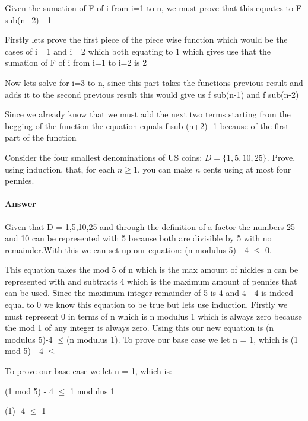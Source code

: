 \documentclass{article}
\begin{document}
{{Given the sumation of F of i from i=1 to n, we must prove that this equates to F sub(n+2) - 1 }

{Firstly lets prove the first piece of the piece wise function which would be the cases of i =1 and i =2 which both equating to 1 which gives use that the sumation of F of i from i=1 to i=2 is 2}

{Now lets solve for i=3 to n, since this part takes the functions previous result and adds it to the second previous result this would give us f sub(n-1) and f sub(n-2)}

{Since we already know that we must add the next two terms starting from the begging of the function the equation equals f sub (n+2) -1 because of the first part of the function}

 

Consider the four smallest denominations of US coins: $D=\{1,5,10,25\}$.  Prove, using
induction, that, for each $n \geq 1$, you can make $n$ cents using at most four
pennies.

\paragraph{Answer}


{Given that D = 1,5,10,25 and through the definition of a factor the numbers 25 and 10 can be represented with 5 because both are divisible by 5 with no remainder.With this we can set up our equation: (n modulus 5) - 4 $ \le $ 0. }

{This equation takes the mod 5 of n which is the max amount of nickles n can be represented with and subtracts 4 which is the maximum amount of pennies that can be used. Since the maximum integer remainder of 5 is 4 and 4 - 4 is indeed equal to 0 we know this equation to be true but lets use induction. Firstly we must represent 0 in terms of n which is n modulus 1 which is always zero because the mod  1 of any integer is always zero. Using this our new equation is (n modulus 5)-4 $ \le $(n modulus 1). To prove our base case we let n = 1, which is (1 mod 5) - 4 $\le $   }


{To prove our base case we let n = 1, which is: }

{(1 mod 5) - 4 $\le $ 1 modulus 1}

{(1)- 4 $\le $ 1}

}
\end{document}

